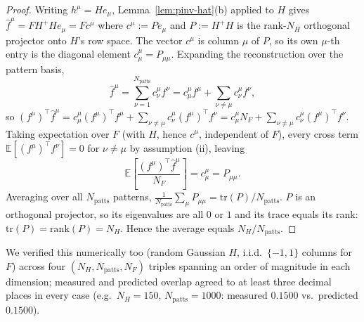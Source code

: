 \documentclass[11pt]{article}
\begin{document}
\begin{proof}
Writing $h^\mu=He_\mu$, Lemma~\ref{lem:pinv-hat}(b) applied to $H$ gives $\hat f^\mu = FH^+He_\mu =
Fc^\mu$ where $c^\mu:=Pe_\mu$ and $P:=H^+H$ is the rank-$N_H$ orthogonal projector onto $H$'s row
space. The vector $c^\mu$ is column $\mu$ of $P$, so its own $\mu$-th entry is the diagonal
element $c^\mu_\mu=P_{\mu\mu}$. Expanding the reconstruction over the pattern basis,
\[
\hat f^\mu = \sum_{\nu=1}^{N_{\mathrm{patts}}} c^\mu_\nu f^\nu = c^\mu_\mu f^\mu + \sum_{\nu\ne\mu} c^\mu_\nu f^\nu,
\]
so $(f^\mu)^\top\hat f^\mu = c^\mu_\mu(f^\mu)^\top f^\mu + \sum_{\nu\ne\mu}c^\mu_\nu(f^\mu)^\top f^\nu
= c^\mu_\mu N_F + \sum_{\nu\ne\mu}c^\mu_\nu(f^\mu)^\top f^\nu$. Taking expectation over $F$ (with
$H$, hence $c^\mu$, independent of $F$), every cross term $\mathbb{E}[(f^\mu)^\top f^\nu]=0$ for
$\nu\ne\mu$ by assumption (ii), leaving
\[
\mathbb{E}\!\left[\frac{(f^\mu)^\top \hat f^\mu}{N_F}\right] = c^\mu_\mu = P_{\mu\mu}.
\]
Averaging over all $N_{\mathrm{patts}}$ patterns,
$\frac{1}{N_{\mathrm{patts}}}\sum_\mu P_{\mu\mu} = \mathrm{tr}(P)/N_{\mathrm{patts}}$. $P$ is an
orthogonal projector, so its eigenvalues are all $0$ or $1$ and its trace equals its rank:
$\mathrm{tr}(P)=\mathrm{rank}(P)=N_H$. Hence the average equals $N_H/N_{\mathrm{patts}}$.
\end{proof}

We verified this numerically too (random Gaussian $H$, i.i.d.\ $\{-1,1\}$ columns for $F$) across
four $(N_H,N_{\mathrm{patts}},N_F)$ triples spanning an order of magnitude in each dimension;
measured and predicted overlap agreed to at least three decimal places in every case (e.g.\
$N_H{=}150$, $N_{\mathrm{patts}}{=}1000$: measured $0.1500$ vs.\ predicted $0.1500$).
\end{document}
